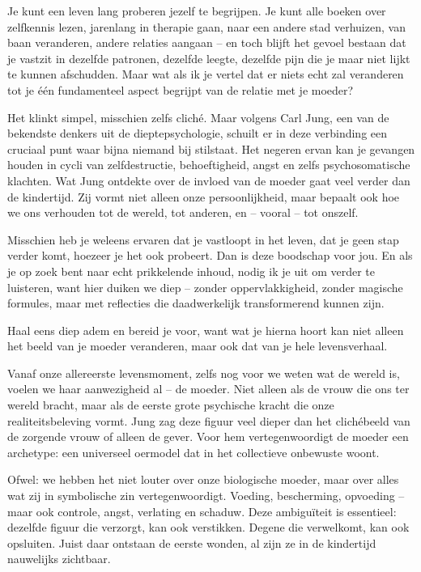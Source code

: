 Je kunt een leven lang proberen jezelf te begrijpen. Je kunt alle boeken over zelfkennis lezen, jarenlang in therapie gaan, naar een andere stad verhuizen, van baan veranderen, andere relaties aangaan – en toch blijft het gevoel bestaan dat je vastzit in dezelfde patronen, dezelfde leegte, dezelfde pijn die je maar niet lijkt te kunnen afschudden. Maar wat als ik je vertel dat er niets echt zal veranderen tot je één fundamenteel aspect begrijpt van de relatie met je moeder?

Het klinkt simpel, misschien zelfs cliché. Maar volgens Carl Jung, een van de bekendste denkers uit de dieptepsychologie, schuilt er in deze verbinding een cruciaal punt waar bijna niemand bij stilstaat. Het negeren ervan kan je gevangen houden in cycli van zelfdestructie, behoeftigheid, angst en zelfs psychosomatische klachten. Wat Jung ontdekte over de invloed van de moeder gaat veel verder dan de kindertijd. Zij vormt niet alleen onze persoonlijkheid, maar bepaalt ook hoe we ons verhouden tot de wereld, tot anderen, en – vooral – tot onszelf.

Misschien heb je weleens ervaren dat je vastloopt in het leven, dat je geen stap verder komt, hoezeer je het ook probeert. Dan is deze boodschap voor jou. En als je op zoek bent naar echt prikkelende inhoud, nodig ik je uit om verder te luisteren, want hier duiken we diep – zonder oppervlakkigheid, zonder magische formules, maar met reflecties die daadwerkelijk transformerend kunnen zijn.

Haal eens diep adem en bereid je voor, want wat je hierna hoort kan niet alleen het beeld van je moeder veranderen, maar ook dat van je hele levensverhaal.

Vanaf onze allereerste levensmoment, zelfs nog voor we weten wat de wereld is, voelen we haar aanwezigheid al – de moeder. Niet alleen als de vrouw die ons ter wereld bracht, maar als de eerste grote psychische kracht die onze realiteitsbeleving vormt. Jung zag deze figuur veel dieper dan het clichébeeld van de zorgende vrouw of alleen de gever. Voor hem vertegenwoordigt de moeder een archetype: een universeel oermodel dat in het collectieve onbewuste woont.

Ofwel: we hebben het niet louter over onze biologische moeder, maar over alles wat zij in symbolische zin vertegenwoordigt. Voeding, bescherming, opvoeding – maar ook controle, angst, verlating en schaduw. Deze ambiguïteit is essentieel: dezelfde figuur die verzorgt, kan ook verstikken. Degene die verwelkomt, kan ook opsluiten. Juist daar ontstaan de eerste wonden, al zijn ze in de kindertijd nauwelijks zichtbaar.

